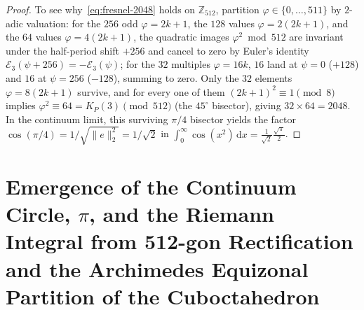 \documentclass[11pt,a4paper]{article}
\theoremstyle{plain}
\theoremstyle{definition}
\begin{document}
\begin{proof}
To see why~\eqref{eq:fresnel-2048} holds on $\mathbb{Z}_{512}$, partition $\varphi\in\{0,\dots,511\}$ by $2$-adic valuation:
for the $256$ odd $\varphi=2k+1$, the $128$ values $\varphi=2(2k+1)$, and the $64$ values $\varphi=4(2k+1)$, the quadratic images $\varphi^2\bmod 512$ are invariant under the half-period shift $+256$ and cancel to zero by Euler's identity $\mathcal{E}_3(\psi+256)=-\mathcal{E}_3(\psi)$; for the $32$ multiples $\varphi=16k$, $16$ land at $\psi=0$ ($+128$) and $16$ at $\psi=256$ ($-128$), summing to zero. Only the $32$ elements $\varphi=8(2k+1)$ survive, and for every one of them $(2k+1)^2\equiv 1\pmod 8$ implies $\varphi^2\equiv 64 = K_P(3)\pmod{512}$ (the $45^\circ$ bisector), giving $32\times 64 = 2048$. In the continuum limit, this surviving $\pi/4$ bisector yields the factor $\cos(\pi/4) = 1/\sqrt{\|e\|_2^2} = 1/\sqrt{2}$ in $\int_0^\infty\cos(x^2)\,\mathrm{d}x = \frac{1}{\sqrt{2}}\frac{\sqrt{\pi}}{2}$.
\end{proof}

\section{Emergence of the Continuum Circle, \texorpdfstring{$\pi$}{pi}, and the Riemann Integral from 512-gon Rectification and the Archimedes Equizonal Partition of the Cuboctahedron}
\label{sec:continuum-emergence}
\end{document}
